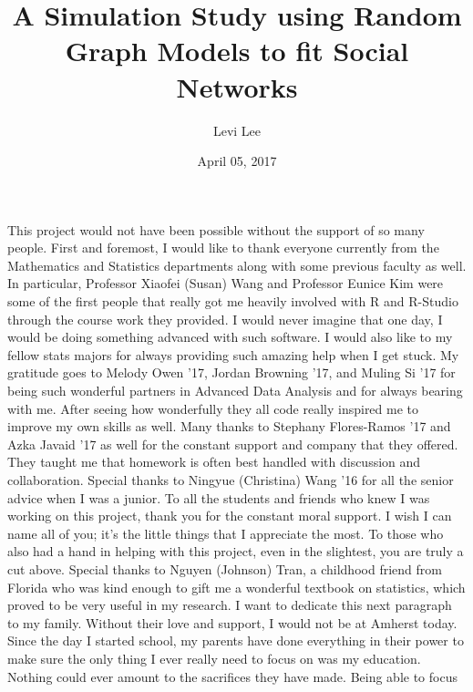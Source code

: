 \documentclass[12pt,twoside]{amherstthesis}
\title{A Simulation Study using Random Graph Models to fit Social Networks}
\author{Levi Lee}
\date{April 05, 2017}
\begin{document}
      \maketitle
  
  \frontmatter %
  \pagestyle{empty} %

      \begin{acknowledgements}
      This project would not have been possible without the support of so many
      people. First and foremost, I would like to thank everyone currently
      from the Mathematics and Statistics departments along with some previous
      faculty as well. In particular, Professor Xiaofei (Susan) Wang and
      Professor Eunice Kim were some of the first people that really got me
      heavily involved with R and R-Studio through the course work they
      provided. I would never imagine that one day, I would be doing something
      advanced with such software. I would also like to my fellow stats majors
      for always providing such amazing help when I get stuck. My gratitude
      goes to Melody Owen '17, Jordan Browning '17, and Muling Si '17 for
      being such wonderful partners in Advanced Data Analysis and for always
      bearing with me. After seeing how wonderfully they all code really
      inspired me to improve my own skills as well. Many thanks to Stephany
      Flores-Ramos '17 and Azka Javaid '17 as well for the constant support
      and company that they offered. They taught me that homework is often
      best handled with discussion and collaboration. Special thanks to
      Ningyue (Christina) Wang '16 for all the senior advice when I was a
      junior. To all the students and friends who knew I was working on this
      project, thank you for the constant moral support. I wish I can name all
      of you; it's the little things that I appreciate the most. To those who
      also had a hand in helping with this project, even in the slightest, you
      are truly a cut above. Special thanks to Nguyen (Johnson) Tran, a
      childhood friend from Florida who was kind enough to gift me a wonderful
      textbook on statistics, which proved to be very useful in my research. I
      want to dedicate this next paragraph to my family. Without their love
      and support, I would not be at Amherst today. Since the day I started
      school, my parents have done everything in their power to make sure the
      only thing I ever really need to focus on was my education. Nothing
      could ever amount to the sacrifices they have made. Being able to focus

\end{acknowledgements}
\end{document}
